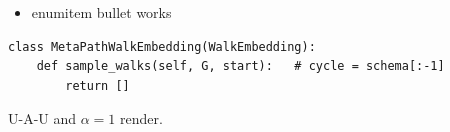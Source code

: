 \documentclass[11pt]{article}
\begin{document}
\begin{itemize}[label=$\bullet$]\item enumitem bullet works\end{itemize}
\begin{lstlisting}[style=p2code]
class MetaPathWalkEmbedding(WalkEmbedding):
    def sample_walks(self, G, start):   # cycle = schema[:-1]
        return []
\end{lstlisting}
\textsf{U-A-U} and $\alpha{=}1$ render.
\end{document}
